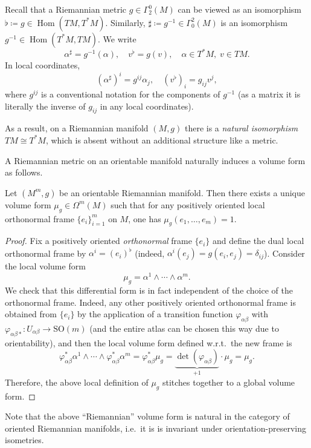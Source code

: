 \documentclass[english,letterpaper]{article}%
\numberwithin{equation}{section}
\numberwithin{figure}{section}
\numberwithin{table}{section}
\theoremstyle{definition}
\theoremstyle{definition}
\theoremstyle{definition}
\theoremstyle{plain}
\theoremstyle{plain}
\theoremstyle{plain}
\theoremstyle{plain}
\theoremstyle{remark}
\theoremstyle{remark}
\DeclareMathOperator{\Hom}{Hom}
\begin{document}
\begin{defn}
    Recall that a Riemannian metric $g\in\Gamma^0_2(M)$ can be viewed as an isomorphism $\flat\coloneqq g\in\Hom(TM,T^\ast M)$. Similarly, $\sharp\coloneqq g^{-1}\in\Gamma_0^2(M)$ is an isomorphism $g^{-1}\in\Hom(T^\ast M,TM)$. We write 
    \[\alpha^\sharp=g^{-1}(\alpha),\quad v^\flat=g(v),\quad \alpha\in T^\ast M,\;v\in TM.\]
    In local coordinates,
    \[(\alpha^\sharp)^i=g^{ij}\alpha_j,\quad (v^\flat)_i=g_{ij}v^j,\]
    where $g^{ij}$ is a conventional notation for the components of $g^{-1}$ (as a matrix it is literally the inverse of $g_{ij}$ in any local coordinates).
    
    As a result, on a Riemannian manifold $(M,g)$ there is a \emph{natural isomorphism} $TM\cong T^\ast M$, which is absent without an additional structure like a metric.
\end{defn}


A Riemannian metric on an orientable manifold naturally induces a volume form as follows.


\begin{thm}
    Let $(M^m,g)$ be an orientable Riemannian manifold. Then there exists a unique volume form $\mu_g\in\Omega^m(M)$ such that for any positively oriented local orthonormal frame $\{e_i\}_{i=1}^m$ on $M$, one has $\mu_g(e_1,\ldots,e_m)=1$.
\end{thm}
\begin{proof}
    Fix a positively oriented \emph{orthonormal} frame $\{e_i\}$ and define the dual local orthonormal frame by $\alpha^i=(e_i)^\flat$ (indeed, $\alpha^i(e_j)=g(e_i,e_j)=\delta_{ij}$). Consider the local volume form
    \[\mu_g=\alpha^1\wedge \cdots\wedge \alpha^m.\]
    We check that this differential form is in fact independent of the choice of the orthonormal frame. Indeed, any other positively oriented orthonormal frame is obtained from $\{e_i\}$ by the application of a transition function $\varphi_{\alpha\beta}$ with $\varphi_{\alpha\beta\ast}:U_{\alpha\beta}\to \mathrm{SO}(m)$ (and the entire atlas can be chosen this way due to orientability), and then the local volume form defined w.r.t.\ the new frame is
    \[\varphi_{\alpha\beta}^\ast\alpha^1\wedge\cdots\wedge\varphi_{\alpha\beta}^\ast\alpha^m=\varphi_{\alpha\beta}^\ast \mu_g=\underbrace{\det(\varphi_{\alpha\beta})}_{+1}\cdot\mu_g=\mu_g.\]
    Therefore, the above local definition of $\mu_g$ stitches together to a global volume form.
\end{proof}

Note that the above ``Riemannian'' volume form is natural in the category of oriented Riemannian manifolds, i.e.\ it is is invariant under orientation-preserving isometries.
\end{document}
